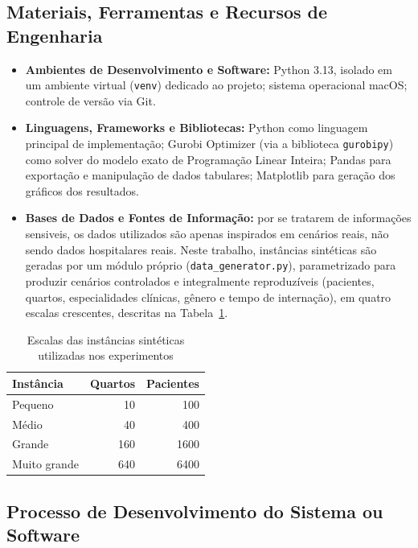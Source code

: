 \documentclass[12pt,a4paper]{article}
\begin{document}
\subsection{Materiais, Ferramentas e Recursos de Engenharia}

\begin{itemize}
    \item \textbf{Ambientes de Desenvolvimento e Software:} Python 3.13, isolado em
    um ambiente virtual (\texttt{venv}) dedicado ao projeto; sistema operacional
    macOS; controle de versão via Git.

    \item \textbf{Linguagens, Frameworks e Bibliotecas:} Python como linguagem
    principal de implementação; Gurobi Optimizer (via a biblioteca
    \texttt{gurobipy}) como solver do modelo exato de Programação Linear
    Inteira; Pandas para exportação e manipulação de dados tabulares;
    Matplotlib para geração dos gráficos dos resultados.

    \item \textbf{Bases de Dados e Fontes de Informação:} por se tratarem de informações sensiveis, os dados utilizados são apenas inspirados em cenários reais, não sendo
    dados hospitalares reais. Neste trabalho, instâncias sintéticas são geradas por
    um módulo próprio (\texttt{data\_generator.py}), parametrizado para produzir
    cenários controlados e integralmente reproduzíveis (pacientes, quartos,
    especialidades clínicas, gênero e tempo de internação), em quatro escalas
    crescentes, descritas na Tabela~\ref{tab:instancias}.
\end{itemize}

\begin{table}[h]
\centering
\caption{Escalas das instâncias sintéticas utilizadas nos experimentos}
\label{tab:instancias}
\begin{tabular}{lrr}
\toprule
Instância & Quartos & Pacientes \\
\midrule
Pequeno & 10 & 100 \\
Médio & 40 & 400 \\
Grande & 160 & 1600 \\
Muito grande & 640 & 6400 \\
\bottomrule
\end{tabular}
\end{table}

\subsection{Processo de Desenvolvimento do Sistema ou Software}
\end{document}
